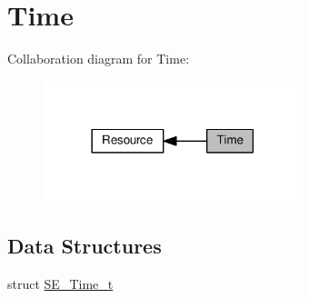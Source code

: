 \hypertarget{group__Time}{}\section{Time}
\label{group__Time}
Collaboration diagram for Time\+:\nopagebreak
\begin{figure}[H]
\begin{center}
\leavevmode
\includegraphics[width=213pt]{group__Time}
\end{center}
\end{figure}
\subsection*{Data Structures}
\begin{DoxyCompactItemize}
\item 
struct \hyperlink{structSE__Time__t}{S\+E\+\_\+\+Time\+\_\+t}
\end{DoxyCompactItemize}

